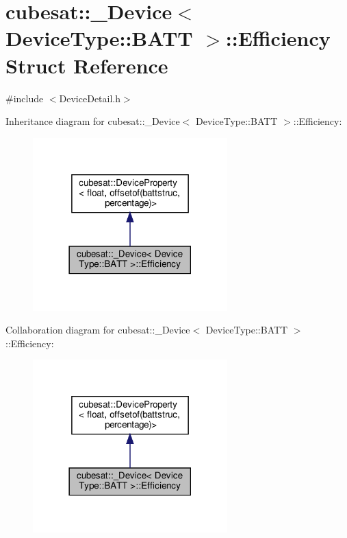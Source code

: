 \hypertarget{structcubesat_1_1__Device_3_01DeviceType_1_1BATT_01_4_1_1Efficiency}{}\section{cubesat\+:\+:\+\_\+\+Device$<$ Device\+Type\+:\+:B\+A\+TT $>$\+:\+:Efficiency Struct Reference}
\label{structcubesat_1_1__Device_3_01DeviceType_1_1BATT_01_4_1_1Efficiency}


{\ttfamily \#include $<$Device\+Detail.\+h$>$}



Inheritance diagram for cubesat\+:\+:\+\_\+\+Device$<$ Device\+Type\+:\+:B\+A\+TT $>$\+:\+:Efficiency\+:\nopagebreak
\begin{figure}[H]
\begin{center}
\leavevmode
\includegraphics[width=213pt]{structcubesat_1_1__Device_3_01DeviceType_1_1BATT_01_4_1_1Efficiency__inherit__graph}
\end{center}
\end{figure}


Collaboration diagram for cubesat\+:\+:\+\_\+\+Device$<$ Device\+Type\+:\+:B\+A\+TT $>$\+:\+:Efficiency\+:\nopagebreak
\begin{figure}[H]
\begin{center}
\leavevmode
\includegraphics[width=213pt]{structcubesat_1_1__Device_3_01DeviceType_1_1BATT_01_4_1_1Efficiency__coll__graph}
\end{center}
\end{figure}
